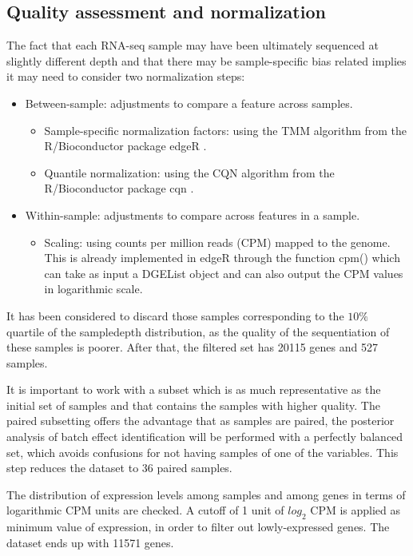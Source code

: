 \documentclass[9pt,twocolumn,twoside]{gsajnl}
\begin{document}
\subsection*{Quality assessment and normalization}
The fact that each RNA-seq sample may have been ultimately sequenced at slightly different depth and that there may be sample-specific bias related implies it may need to consider two normalization steps:
\begin{itemize}
\item Between-sample: adjustments to compare a feature across samples.
\begin{itemize}
\item Sample-specific normalization factors: using the TMM algorithm from the R/Bioconductor package edgeR \citep{Robinson2010b}.
\item Quantile normalization: using the CQN algorithm from the R/Bioconductor package cqn \citep{Hansen2012b}.
\end{itemize}
\item Within-sample: adjustments to compare across features in a sample.
\begin{itemize}
\item Scaling: using counts per million reads (CPM) mapped to the genome. This is already implemented in edgeR \citep{Robinson2010b} through the function cpm() which can take as input a DGEList object and can also output the CPM values in logarithmic scale.
\end{itemize}
\end{itemize}

It has been considered to discard those samples corresponding to the $ 10\% $ quartile of the sampledepth distribution, as the quality of the sequentiation of these samples is poorer. After that, the filtered set has 20115 genes and 527 samples.

It is important to work with a subset which is as much representative as the initial set of samples and that contains the samples with higher quality. The paired subsetting offers the advantage that as samples are paired, the posterior analysis of batch effect identification will be performed with a perfectly balanced set, which avoids confusions for not having samples of one of the variables. This step reduces the dataset to 36 paired samples.

The distribution of expression levels among samples and among genes in terms of logarithmic CPM units are checked. A cutoff of 1 unit of $log_{2}$ CPM is applied as minimum value of expression, in order to filter out lowly-expressed genes. The dataset ends up with 11571 genes.
\end{document}
